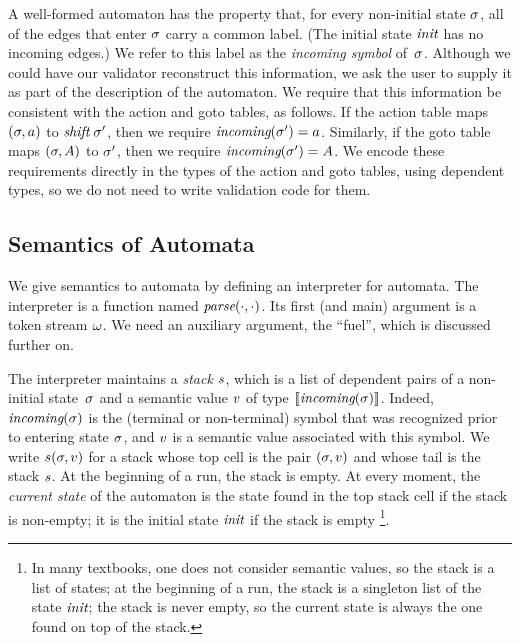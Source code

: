 \documentclass{llncs}
\begin{document}
A well-formed \lr automaton has the property that, for every non-initial state
$\sigma$, all of the edges that enter $\sigma$ carry a common label. (The
initial state $\textit{init}$ has no incoming edges.) We refer to this label as
the \emph{incoming symbol} of~$\sigma$. Although we could have our validator
reconstruct this information, we ask the user to supply it as part of the
description of the automaton. We require that this information be consistent
with the action and goto tables, as follows.
%
If the action table maps $(\sigma,a)$ to $\textit{shift}\;\sigma'$, then we
require $\textit{incoming}(\sigma')=a$. Similarly, if the goto table maps
$(\sigma,A)$ to $\sigma'$, then we require $\textit{incoming}(\sigma')=A$.
We encode these requirements directly in the types of the action and goto
tables, using dependent types, so we do not need to write validation code
for them.

\subsection{Semantics of Automata}
\label{sec:interpreter}

We give semantics to automata by defining an interpreter for automata. The
interpreter is a function named $\textit{parse}(\cdot, \cdot)$. Its first (and main)
argument is a token stream $\omega$. We need an auxiliary argument, the
``fuel'', which is discussed further on.

The interpreter maintains a \emph{stack} $s$, which is a list of dependent pairs
of a non-initial state~$\sigma$ and a semantic value $v$ of type
$\llbracket\textit{incoming}(\sigma)\rrbracket$. Indeed, $\textit{incoming}(\sigma)$ is the (terminal or non-terminal)
symbol that was recognized prior to entering state $\sigma$, and $v$ is a
semantic value associated with this symbol.
%
We write $s(\sigma,v)$ for a stack whose top cell is the pair
$(\sigma,v)$ and whose tail is the stack $s$.
%
At the beginning of a run, the
stack is empty. At every moment, the \emph{current state} of the automaton
is the state found in the top stack cell if the stack is non-empty; it is
the initial state $\textit{init}$ if the stack is empty%
\footnote{In many textbooks, one does not consider semantic
values, so the stack is a list of states; at the beginning of a run,
the stack is a singleton list of the state $\textit{init}$; the stack is never
empty, so the current state is always the one found on top of the stack.}.
\end{document}
